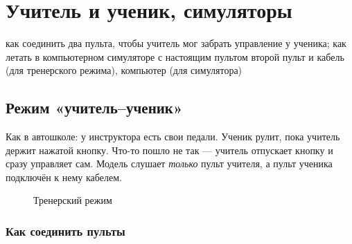 \chapter{Учитель и ученик, симуляторы}
\label{ch:trainer}
\chapterintro
  {как соединить два пульта, чтобы учитель мог забрать управление у ученика; как летать
   в компьютерном симуляторе с настоящим пультом}
  {второй пульт и кабель (для тренерского режима), компьютер (для симулятора)}

\section{Режим «учитель--ученик»}

\begin{simple}
Как в автошколе: у инструктора есть свои педали. Ученик рулит, пока учитель держит нажатой
кнопку. Что-то пошло не так --- учитель отпускает кнопку и сразу управляет сам.
Модель слушает \emph{только} пульт учителя, а пульт ученика подключён к нему кабелем.
\end{simple}

\begin{figure}[H]
\centering
{}
\caption{Тренерский режим}
\end{figure}

\subsection{Как соединить пульты}


